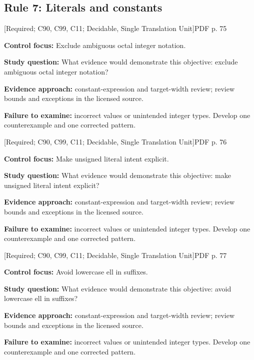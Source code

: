 \documentclass[10pt,letterpaper]{article}
\begin{document}
\subsection{Rule 7: Literals and constants}
 \textsf{\footnotesize [Required; C90, C99, C11; Decidable, Single Translation Unit]}\hfill{\footnotesize PDF p. 75}\par
\textbf{Control focus:} Exclude ambiguous octal integer notation.\par
\textbf{Study question:} What evidence would demonstrate this objective: exclude ambiguous octal integer notation?\par
\textbf{Evidence approach:} constant-expression and target-width review; review bounds and exceptions in the licensed source.\par
\textbf{Failure to examine:} incorrect values or unintended integer types. Develop one counterexample and one corrected pattern.\par
\smallskip
{}
 \textsf{\footnotesize [Required; C90, C99, C11; Decidable, Single Translation Unit]}\hfill{\footnotesize PDF p. 76}\par
\textbf{Control focus:} Make unsigned literal intent explicit.\par
\textbf{Study question:} What evidence would demonstrate this objective: make unsigned literal intent explicit?\par
\textbf{Evidence approach:} constant-expression and target-width review; review bounds and exceptions in the licensed source.\par
\textbf{Failure to examine:} incorrect values or unintended integer types. Develop one counterexample and one corrected pattern.\par
\smallskip
{}
 \textsf{\footnotesize [Required; C90, C99, C11; Decidable, Single Translation Unit]}\hfill{\footnotesize PDF p. 77}\par
\textbf{Control focus:} Avoid lowercase ell in suffixes.\par
\textbf{Study question:} What evidence would demonstrate this objective: avoid lowercase ell in suffixes?\par
\textbf{Evidence approach:} constant-expression and target-width review; review bounds and exceptions in the licensed source.\par
\textbf{Failure to examine:} incorrect values or unintended integer types. Develop one counterexample and one corrected pattern.\par
\end{document}
